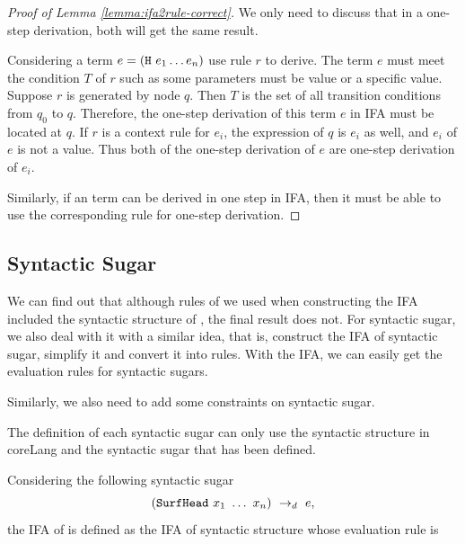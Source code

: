 \begin{proof}[Proof of Lemma \ref{lemma:ifa2rule-correct}]
We only need to discuss that in a one-step derivation, both will get the same result.

Considering a term $e=(\mbox{\tt H}~e_1 \ldots e_n)$ use rule $r$ to derive. The term $e$ must meet the condition $T$ of $r$ such as some parameters must be value or a specific value. Suppose $r$ is generated by node $q$. Then $T$ is the set of all transition conditions from $q_0$ to $q$. Therefore, the one-step derivation of this term $e$ in IFA must be located at $q$. If $r$ is a context rule for $e_i$, the expression of $q$ is $e_i$ as well, and $e_i$ of $e$ is not a value. Thus both of the one-step derivation of $e$ are one-step derivation of $e_i$. 

Similarly, if an term can be derived in one step in IFA, then it must be able to use the corresponding rule for one-step derivation.

\end{proof}

\subsection{Syntactic Sugar}

We can find out that although rules of  we used when constructing the IFA included the syntactic structure of , the final result does not. For syntactic sugar, we also deal with it with a similar idea, that is, construct the IFA of syntactic sugar, simplify it and convert it into rules. With the IFA, we can easily get the evaluation rules for syntactic sugars.

Similarly, we also need to add some constraints on syntactic sugar.

\begin{Asm}
\label{Asm:orderliness-sugar}
The definition of each syntactic sugar can only use the syntactic structure in coreLang and the syntactic sugar that has been defined.
\end{Asm}

\begin{Def}
\label{def:ifa-sugar}
Considering the following syntactic sugar
\[
(\mbox{\tt SurfHead}~x_1~\ldots~x_n) ~\rightarrow_d~ e,
\]
the IFA of  is defined as the IFA of syntactic structure  whose evaluation rule is

\end{Def}

